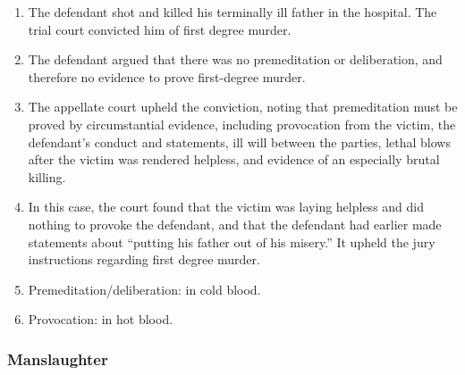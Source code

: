 \begin{enumerate}
    \item The defendant shot and killed his terminally ill father in the hospital. The trial court convicted him of first degree murder.
    \item The defendant argued that there was no premeditation or deliberation, and therefore no evidence to prove first-degree murder.
    \item The appellate court upheld the conviction, noting that premeditation must be proved by circumstantial evidence, including provocation from the victim, the defendant's conduct and statements, ill will between the parties, lethal blows after the victim was rendered helpless, and evidence of an especially brutal killing.
    \item In this case, the court found that the victim was laying helpless and did nothing to provoke the defendant, and that the defendant had earlier made statements about ``putting his father out of his misery.'' It upheld the jury instructions regarding first degree murder. %
    \item Premeditation/deliberation: in cold blood.
    \item Provocation: in hot blood.
\end{enumerate}

\subsubsection{Manslaughter}

